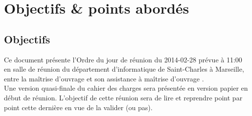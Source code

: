 \documentclass[11pt,fleqn]{report}
\begin{document}
\ZMakeCover


\chapter{Objectifs \& points abordés}

\section{Objectifs}
Ce document présente l'Ordre du jour de réunion du 2014-02-28 prévue à 11:00 en salle de réunion du département d'informatique de Saint-Charles à Marseille, entre la maîtrise d'ouvrage \mo et son assistance à maîtrise d'ouvrage \amo.
\\
Une version quasi-finale du cahier des charges sera présentée en version papier en début de réunion. L'objectif de cette réunion sera de lire et reprendre point par point cette dernière en vue de la valider (ou pas).
\end{document}
